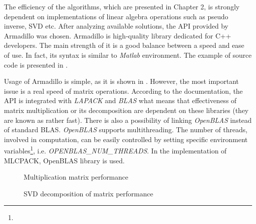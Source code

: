 The efficiency of the algorithms, which are presented in Chapter 2, is strongly dependent on implementations of linear algebra operations such as pseudo inverse, SVD etc. After analyzing available solutions, the API provided by Armadillo was chosen. Armadillo is high-quality library dedicated for C++ developers. The main strength of it is a good balance between a speed and ease of use. In fact, its syntax is similar to \textit{Matlab} environment. The example of source code is presented in .

Usage of Armadillo is simple, as it is shown in . However, the most important issue is a real speed of matrix operations. According to the documentation, the API is integrated with \textit{LAPACK} and \textit{BLAS} what means that effectiveness of matrix multiplication or its decomposition are dependent on these libraries (they are known as rather fast). There is also a possibility of linking \textit{OpenBLAS} instead of standard BLAS. \textit{OpenBLAS} supports multithreading. The number of threads, involved in computation, can be easily controlled by setting specific environment variables\footnote{}, i.e. \textit{OPENBLAS\_NUM\_THREADS}. In the implementation of MLCPACK, OpenBLAS library is used.    

\begin{figure}[h]
\centering
\caption{Multiplication matrix performance}
\label{fig:mulperf}
\end{figure}

\begin{figure}[h]
\centering
\caption{SVD decomposition of matrix performance}
\label{fig:svdperf}
\end{figure}


